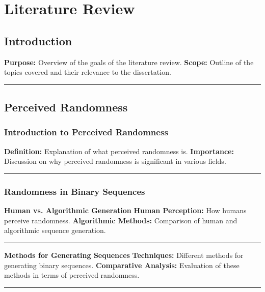 \section{Literature Review}\label{section:Literature_Review}
\subsection{Introduction}
\textbf{Purpose:} Overview of the goals of the literature review.\newline
\textbf{Scope:} Outline of the topics covered and their relevance to the dissertation.\newline
\noindent\rule{\textwidth}{0.1pt}

\newpage

\subsection{Perceived Randomness}
\subsubsection{Introduction to Perceived Randomness}
\textbf{Definition:} Explanation of what perceived randomness is.\newline
\textbf{Importance:} Discussion on why perceived randomness is significant in various fields.\newline
\noindent\rule{\textwidth}{0.1pt}

\subsubsection{Randomness in Binary Sequences}
\textbf{Human vs. Algorithmic Generation}\newline
\textbf{Human Perception:} How humans perceive randomness.\newline
\textbf{Algorithmic Methods:} Comparison of human and algorithmic sequence generation.\newline
\noindent\rule{\textwidth}{0.1pt}

\noindent\textbf{Methods for Generating Sequences}\newline
\textbf{Techniques:} Different methods for generating binary sequences.\newline
\textbf{Comparative Analysis:} Evaluation of these methods in terms of perceived randomness.\newline
\noindent\rule{\textwidth}{0.1pt}

\newpage


